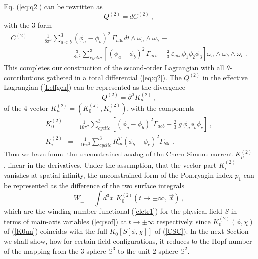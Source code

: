 \documentclass[a4paper,12pt]{article}
\newcommand{\nn}{\nonumber}
\begin{document}
Eq. (\ref{eq:q2})
can be rewritten as
\begin{equation}
\label{dC}
Q^{(2)}= d C^{(2)}~,
\end{equation}
with the 3-form
\begin{eqnarray}
 C^{(2)}&=& \frac{1}{8\pi^2}\sum_{a<b}^3 (\phi_a-\phi_b)^2\,\Gamma_{a0b}
dt\wedge\omega_a \wedge  \omega_b \,- \nn\\
&&\quad\quad\quad
-\frac{3}{8\pi^2}\sum_{cyclic}^3 \left[(\phi_a-\phi_b)^2\,\Gamma_{acb}
-\frac{2}{3}\ \varepsilon_{abc}\phi_1\phi_2\phi_3\right]
\omega_a \wedge \omega_b \wedge \omega_c~.
\end{eqnarray}
This completes our construction of the second-order
Lagrangian with all $\theta$-contributions gathered in a total
differential (\ref{eq:q2}).
The $Q^{(2)}$ in the effective Lagrangian (\ref{Leffgen})
can be represented as the divergence
\begin{equation}
Q^{(2)} = \partial^\mu K^{(2)}_\mu\,,
\end{equation}
of the 4-vector $K^{(2)}_\mu=(K^{(2)}_0,K^{(2)}_i)$, with the components
\begin{eqnarray}
\label{K0un}
K^{(2)}_0 &=& \frac{1}{16\pi^2}
\sum_{cyclic}^3 \left[(\phi_a-\phi_b)^2\Gamma_{acb}
-\frac{2}{3}\ g\ \phi_a\phi_b\phi_c\right]~,\\
K^{(2)}_i &=&\,\frac{1}{16\pi^2}\sum_{cyclic}^3
R^T_{ia}(\phi_b-\phi_c)^2\Gamma_{b0c}~.
\end{eqnarray}
Thus we have found the unconstrained analog of the Chern-Simons current
$K_\mu^{(2)}$, linear in the derivatives.
Under the assumption, that the vector part  $K^{(2)}_i$ vanishes
at spatial infinity, the unconstrained form of the Pontryagin index $p_1$
can be represented as the difference of the two surface integrals
\begin{equation}
\label{eq:achsgen}
W_\pm = \int d^3x\,\, K_0^{(2)}\left( t \to  \pm\infty, \, {\vec x}\right)\,,
\end{equation}
which are the winding number functional (\ref{clctr1}) for the physical
field $S$ in terms of main-axis variables (\ref{eq:sof}) at $t \to\pm\infty $
respectively,
since $K_0^{(2)}(\phi,\chi)$ of (\ref{K0un}) coincides with the full
$K_0[S[\phi,\chi]]$ of (\ref{CSC}).
In the next Section we shall show, how for certain field configurations,
it reduces to the Hopf number of the
mapping from the $3$-sphere $\mathbb{S}^3$ to the unit $2$-sphere
$\mathbb{S}^2$.


\end{document}
